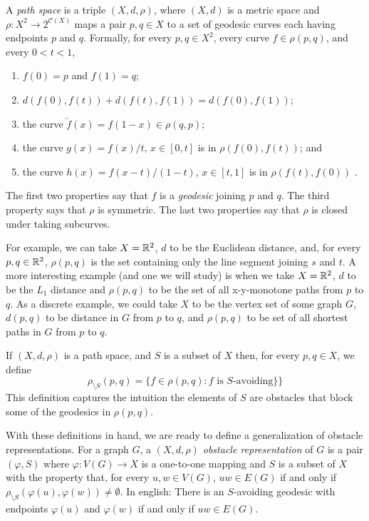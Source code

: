 \documentclass{patmorin}
\begin{document}
A \emph{path space} is a triple $(X,d,\rho)$, where $(X,d)$ is a metric
space and $\rho:X^2\to 2^{\mathcal{C}(X)}$ maps a pair $p,q\in X$ to
a set of geodesic curves each having endpoints $p$ and $q$.  Formally,
for every $p,q\in X^2$, every curve $f\in \rho(p,q)$, and every $0<t<1$,
\begin{enumerate}
  \item $f(0)=p$ and $f(1)=q$;
  \item $d(f(0),f(t)) + d(f(t),f(1)) = d(f(0),f(1))$; 
  \item the curve $\overleftarrow{f}(x)=f(1-x)\in \rho(q,p)$;
  \item the curve $g(x)=f(x)/t$, $x\in[0,t]$ is in $\rho(f(0),f(t))$; and
  \item the curve $h(x)=f(x-t)/(1-t)$, $x\in[t,1]$ is in $\rho(f(t),f(0))$ \enspace .
\end{enumerate} 
The first two properties say that $f$ is a \emph{geodesic} joining $p$
and $q$.  The third property says that $\rho$ is symmetric. The last
two properties say that $\rho$ is closed under taking subcurves.

For example, we can take $X=\mathbb{R}^2$, $d$ to be the Euclidean distance,
and, for every $p,q\in\mathbb{R}^2$, $\rho(p,q)$ is the set containing only
the line segment joining $s$ and $t$.  A more interesting example
(and one we will study) is when we take $X=\mathbb{R}^2$, $d$ to be the $L_1$
distance and $\rho(p,q)$ to be the set of all x-y-monotone paths from
$p$ to $q$. As a discrete example, we could take $X$ to be the vertex set
of some graph $G$, $d(p,q)$ to be distance in $G$ from $p$ to $q$, 
and $\rho(p,q)$ to be set of all shortest paths in $G$ from $p$ to $q$.

If $(X,d,\rho)$ is a path space, and $S$ is a subset of $X$ then, for
every $p,q\in X$, we define
\[
    \rho_{\setminus S}(p,q) = \{f\in\rho(p,q) : \text{$f$ is $S$-avoiding} \}  \}
\]
This definition captures the intuition the elements of $S$ are obstacles
that block some of the geodesics in $\rho(p,q)$.

With these definitions in hand, we are ready to define a generalization of
obstacle representations.  For a graph $G$, a \emph{$(X,d,\rho)$ obstacle
representation} of $G$ is a pair $(\varphi, S)$ where $\varphi:V(G)\to X$
is a one-to-one mapping and $S$ is a subset of $X$ with the property that,
for every $u,w\in V(G)$, $uw\in E(G)$ if and only if $\rho_{\setminus
S}(\varphi(u),\varphi(w))\neq\emptyset$. In english: There is an
$S$-avoiding geodesic with endpoints $\varphi(u)$ and $\varphi(w)$
if and only if $uw\in E(G)$.
\end{document}
